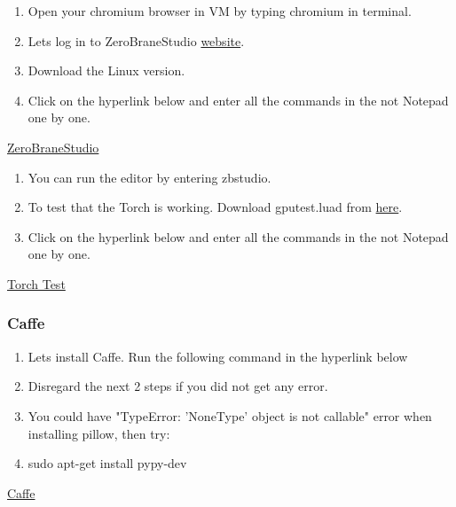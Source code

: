 \documentclass[12pt]{article}
\begin{document}
\begin{enumerate}[resume]
  \item Open your chromium browser in VM by typing chromium in terminal.
  \item Lets log in to ZeroBraneStudio \href{https://studio.zerobrane.com/download?not-this-time}{website}.
  \item Download the Linux version.	
  \item Click on the hyperlink below and enter all the commands in the not Notepad one by one.
\end{enumerate}

\begin{center}
\href{run:./Text_Files_16/ZeroB.txt}{\Large ZeroBraneStudio}
\end{center}

\begin{enumerate}[resume]
  \item You can run the editor by entering zbstudio.
  \item To test that the Torch is working. Download gputest.luad from \href{https://gist.github.com/jaderberg/6436387}{here}.
  \item Click on the hyperlink below and enter all the commands in the not Notepad one by one.
\end{enumerate}

\begin{center}
\href{run:./Text_Files_16/Torch_test.txt}{\Large Torch Test}
\end{center}


\subsubsection{Caffe}

\begin{enumerate}[resume]
  \item Lets install Caffe. Run the following command in the hyperlink below
  \item Disregard the next 2 steps if you did not get any error.
  \item You could have "TypeError: 'NoneType' object is not callable" error when installing pillow, then try:
  \item sudo apt-get install pypy-dev
\end{enumerate}

\begin{center}
\href{run:./Text_Files_16/Caffe.txt}{\Large Caffe}
\end{center}
\end{document}
